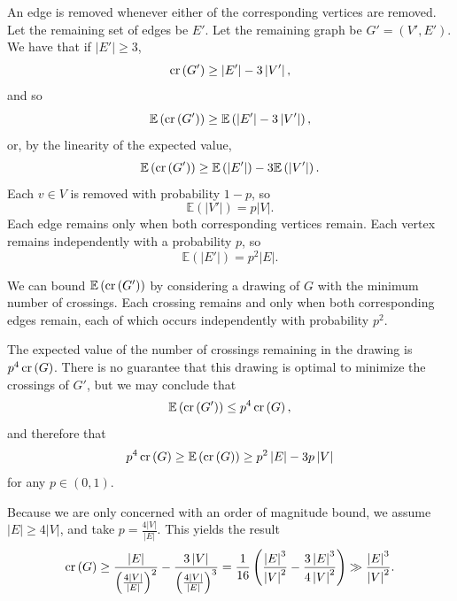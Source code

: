 \documentclass[12pt,reqno]{amsart}
\begin{document}
An edge is
removed whenever either of the corresponding vertices are removed. Let the remaining set of edges be \(E'\). Let the remaining graph be
\(G' = (V',E')\). We have that if \(\left\lvert E' \right\rvert \geq 3\),
\[
    \operatorname{cr}\left( G' \right) \geq \left\lvert E' \right\rvert - 3 \left\lvert V' \right\rvert 
,\]
and so
\[
    \mathbb{E} \left( \operatorname{cr}\left( G' \right)  \right) \geq \mathbb{E} \left( \left\lvert E' \right\rvert - 3 \left\lvert V' \right\rvert  \right) 
,\]
or, by the linearity of the expected value,
\[
    \mathbb{E} \left( \operatorname{cr}\left( G' \right)  \right) \geq \mathbb{E} \left( \left\lvert E' \right\rvert  \right) - 3 \mathbb{E} \left( \left\lvert V' \right\rvert  \right)    
.\]
Each \(v \in V\) is removed with probability \(1-p\), so
\[
    \mathbb{E} \left( \left\lvert V' \right\rvert  \right) = p \left\lvert V \right\rvert 
.\]
Each edge remains only when both corresponding vertices remain. Each vertex remains
independently with a probability \(p\), so 
\[
    \mathbb{E} \left( \left\lvert E' \right\rvert  \right) = p^{2}\left\lvert E \right\rvert 
.\]

We can bound \(\mathbb{E} \left( \operatorname{cr}\left( G' \right)  \right) \) by considering a drawing of \(G\) with the minimum number of crossings. 
Each crossing remains and only when both corresponding edges remain, each of which occurs independently with probability
\(p^{2}\).

The expected value of the number of crossings remaining in the drawing is \(p^{4} \operatorname{cr}\left( G \right) \).
There is no guarantee that this drawing is optimal to minimize the crossings of \(G'\), but we may conclude that
\[
    \mathbb{E} \left( \operatorname{cr}\left( G' \right)  \right) \leq p ^{4} \operatorname{cr}\left( G \right)
,\]
and therefore that
\[
    p^{4} \operatorname{cr}\left( G \right) \geq \mathbb{E} \left( \operatorname{cr}\left( G \right)  \right) \geq p^{2} \left\lvert E \right\rvert - 3 p \left\lvert V \right\rvert 
\]
for any \(p \in (0,1)\). 


Because we are only concerned with an order of magnitude bound, we assume \(\left\lvert E \right\rvert \geq 4\left\lvert V \right\rvert \), and take \(p = \frac{4\left\lvert V \right\rvert }{\left\lvert E \right\rvert }\).
This yields the result
\[
    \operatorname{cr}\left( G \right) \geq \frac{\left\lvert E \right\rvert }{\left( \frac{4 \left\lvert V \right\rvert }{\left\lvert E \right\rvert }   \right)^{2} } - \frac{3 \left\lvert V \right\rvert }{\left( \frac{4 \left\lvert V \right\rvert }{\left\lvert E \right\rvert }  \right) ^{3} } = \frac{1}{16} \left( \frac{\left\lvert E \right\rvert ^{3} }{\left\lvert V \right\rvert ^{2}} - \frac{3 \left\lvert E \right\rvert ^{3} }{4 \left\lvert V \right\rvert ^{2}}  \right) \gg \frac{\left\lvert E \right\rvert ^{3} }{\left\lvert V \right\rvert ^{2}}
.\]
\end{document}

